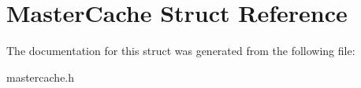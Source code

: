 \hypertarget{structMasterCache}{}\section{Master\+Cache Struct Reference}
\label{structMasterCache}


The documentation for this struct was generated from the following file\+:\begin{DoxyCompactItemize}
\item 
mastercache.\+h\end{DoxyCompactItemize}
